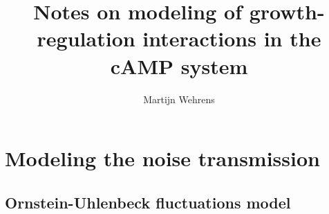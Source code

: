 \documentclass[a4paper,twoside,10pt]{report}
\begin{document}
\pagestyle{empty} %



\title{Notes on modeling of growth-regulation interactions in the cAMP system}
\author{Martijn Wehrens}
\maketitle



\cleardoublepage %

\pagestyle{plain} %









\chapter{Modeling the noise transmission}

\section{Ornstein-Uhlenbeck fluctuations model}
\end{document}
